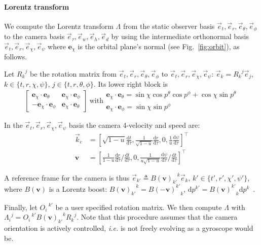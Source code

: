 \documentclass{document}
\newcommand{\diff}{\mathrm d}
\begin{document}
\paragraph*{Lorentz transform} We compute the Lorentz transform $\Lambda$ from 
the static observer basis $\vec{e}_t, \vec{e}_r, \vec{e}_\theta, 
\vec{e}_\phi$ to the camera basis $\vec{e}_\tau, \vec{e}_w, \vec{e}_h, 
\vec{e}_d$ by using the intermediate orthonormal basis $\vec{e}_t, \vec{e}_r, 
\vec{e}_\chi, \vec{e}_\psi$ where $\mathbf{e}_\chi$ is the orbital plane's 
normal (see Fig.~\ref{fig:orbit}), as follows.

Let ${R_k}^j$ be the rotation matrix from $\vec{e}_t, \vec{e}_r, 
\vec{e}_\theta, \vec{e}_\phi$ to $\vec{e}_t, \vec{e}_r, \vec{e}_\chi, 
\vec{e}_\psi$: $\vec{e}_k = {R_k}^j \vec{e}_j$, $k \in \{t, r, \chi, \psi\}$, 
$j \in \{t, r, \theta, \phi\}$. Its lower right block is
\begin{equation*}
\begin{bmatrix}
\mathbf{e}_\chi \cdot \mathbf{e}_\theta & 
    \mathbf{e}_\chi \cdot \mathbf{e}_\phi \\
-\mathbf{e}_\chi \cdot \mathbf{e}_\phi &
     \mathbf{e}_\chi \cdot \mathbf{e}_\theta
\end{bmatrix}\ \mathrm{with}
\begin{array}{l}
\mathbf{e}_\chi \cdot \mathbf{e}_\theta = 
    \sin\chi \cos p^\theta \cos p^\phi + \cos\chi \sin p^\theta \\
\mathbf{e}_\chi \cdot \mathbf{e}_\phi = \sin\chi \sin p^\phi 
\end{array}
\end{equation*}

In the $\vec{e}_t, \vec{e}_r, \vec{e}_\chi, \vec{e}_\psi$ basis the camera 
4-velocity and speed are:
\begin{equation*}
\begin{split}
\vec{k}_c &= \left[ \sqrt{1 - u} \frac{\diff t}{\diff \tau}, \frac{1}{\sqrt{1 - 
u}} \frac{\diff r}{\diff \tau}, 0, \frac{1}{u} \frac{\diff \psi}{\diff \tau} 
\right]^\top \\
\mathbf{v} &= \left[\frac{1}{1 - u} \frac{\diff r}{\diff \tau} / \frac{\diff 
t}{\diff \tau}, 0, \frac{1}{u \sqrt{1 - u}} \frac{\diff \psi}{\diff \tau} / 
\frac{\diff t}{\diff \tau} \right]^\top
\end{split}
\end{equation*}

A reference frame for the camera is thus $\vec{e}_{k'} \triangleq 
{B(\mathbf{v})_{k'}}^k \vec{e}_k$, $k' \in \{t', r', \chi', \psi'\}$, where 
$B(\mathbf{v})$ is a Lorentz boost: ${B(\mathbf{v})_{k'}}^k = 
{B(-\mathbf{v})^{k'}}_k$, $\diff p^{k'} = {B(\mathbf{v})^{k'}}_k \diff 
p^k$~\cite{weinberg1972}.

Finally, let ${O_i\,}^{k'}$ be a user specified rotation matrix. We then 
compute $\Lambda$ with ${\Lambda_i}^j = {O_i\,}^{k'} {B(\mathbf{v})_{k'}}^k 
{R_k}^j$. Note that this procedure assumes that the camera orientation is 
actively controlled, {\em i.e.} is not freely evolving as a gyroscope would be.

  

\end{document}
